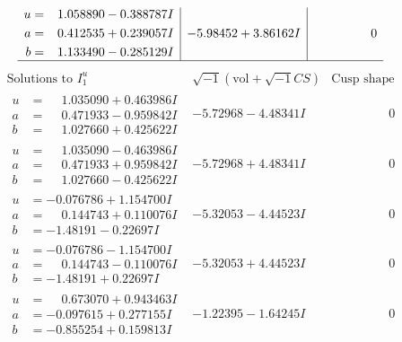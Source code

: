 \documentclass[1p]{elsarticle_modified}
\theoremstyle{definition}
\newcommand{\I}{\sqrt{-1}}
\begin{document}
$$\begin{array}{c|c|c}
\begin{aligned}
u &= \phantom{-}1.058890 - 0.388787 I \\
a &= \phantom{-}0.412535 + 0.239057 I \\
b &= \phantom{-}1.133490 - 0.285129 I\end{aligned}
 & -5.98452 + 3.86162 I & \phantom{-0.000000 } 0\\
 \hline 
 \end{array}$$\newpage$$\begin{array}{c|c|c}  
\text{Solutions to }I^u_{1}& \I (\text{vol} + \sqrt{-1}CS) & \text{Cusp shape}\\
 \hline 
\begin{aligned}
u &= \phantom{-}1.035090 + 0.463986 I \\
a &= \phantom{-}0.471933 - 0.959842 I \\
b &= \phantom{-}1.027660 + 0.425622 I\end{aligned}
 & -5.72968 - 4.48341 I & \phantom{-0.000000 } 0 \\ \hline\begin{aligned}
u &= \phantom{-}1.035090 - 0.463986 I \\
a &= \phantom{-}0.471933 + 0.959842 I \\
b &= \phantom{-}1.027660 - 0.425622 I\end{aligned}
 & -5.72968 + 4.48341 I & \phantom{-0.000000 } 0 \\ \hline\begin{aligned}
u &= -0.076786 + 1.154700 I \\
a &= \phantom{-}0.144743 + 0.110076 I \\
b &= -1.48191 - 0.22697 I\end{aligned}
 & -5.32053 - 4.44523 I & \phantom{-0.000000 } 0 \\ \hline\begin{aligned}
u &= -0.076786 - 1.154700 I \\
a &= \phantom{-}0.144743 - 0.110076 I \\
b &= -1.48191 + 0.22697 I\end{aligned}
 & -5.32053 + 4.44523 I & \phantom{-0.000000 } 0 \\ \hline\begin{aligned}
u &= \phantom{-}0.673070 + 0.943463 I \\
a &= -0.097615 + 0.277155 I \\
b &= -0.855254 + 0.159813 I\end{aligned}
 & -1.22395 - 1.64245 I & \phantom{-0.000000 } 0 \\ \hline\begin{aligned}

\end{aligned}
\end{array}$$
\end{document}

